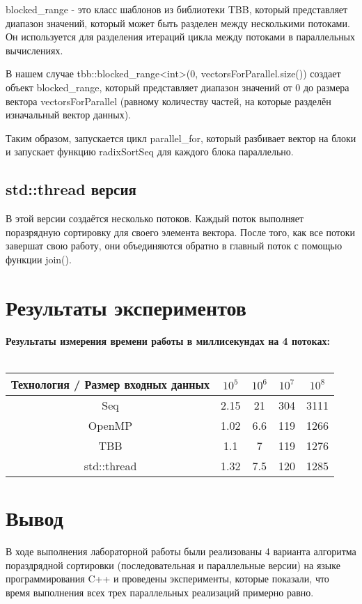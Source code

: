 \documentclass{article}
\begin{document}
blocked\_range - это класс шаблонов из библиотеки TBB, который представляет диапазон значений, который может быть разделен между несколькими потоками. Он используется для разделения итераций цикла между потоками в параллельных вычислениях.

В нашем случае tbb::blocked\_range<int>(0, vectorsForParallel.size()) создает объект blocked\_range, который представляет диапазон значений от 0 до размера вектора vectorsForParallel (равному количеству частей, на которые разделён изначальный вектор данных).

Таким образом, запускается цикл parallel\_for, который разбивает вектор на блоки и запускает функцию radixSortSeq для каждого блока параллельно.

\subsection{std::thread версия}
В этой версии создаётся несколько потоков. Каждый поток выполняет поразрядную сортировку для своего элемента вектора. После того, как все потоки завершат свою работу, они объединяются обратно в главный поток с помощью функции join().

\newpage
\section{Результаты экспериментов}

\noindent\textbf{Результаты измерения времени работы в миллисекундах на 4 потоках:}\\\\
    \begin{tabular}{|c | c | c | c | c |} 
      \hline
      Технология / Размер входных данных & $10^5$ & $10^6$ & $10^7$ & $10^8$ \\
      \hline
      Seq & 2.15 & 21  & 304 & 3111 \\ 
      \hline
      OpenMP & 1.02 & 6.6  & 119 & 1266 \\ 
      \hline
      TBB & 1.1 & 7  & 119 & 1276 \\ 
      \hline
      std::thread & 1.32 & 7.5  & 120 & 1285 \\ 
      \hline
    \end{tabular}


\newpage
\section{Вывод}
В ходе выполнения лабораторной работы были реализованы 4 варианта алгоритма пораздрядной сортировки (последовательная и параллельные версии) на языке программирования C++ и проведены эксперименты, которые показали, что время выполнения всех трех параллельных реализаций примерно равно.
\end{document}
